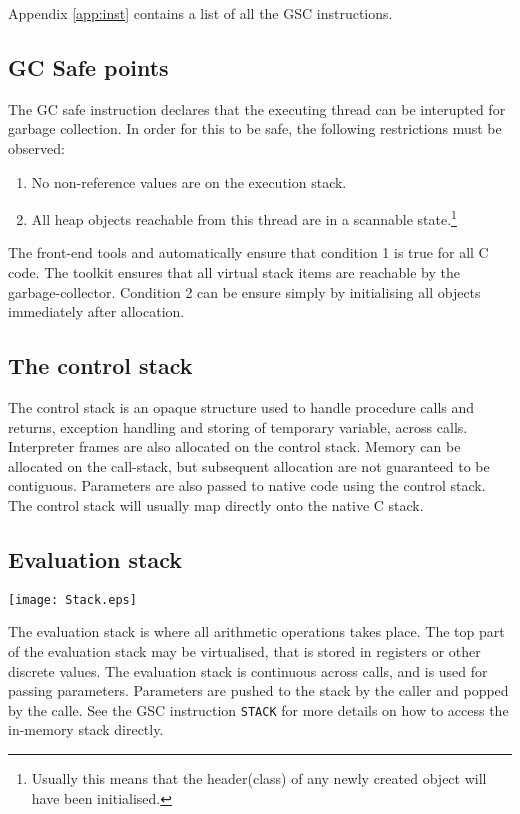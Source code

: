 Appendix \ref{app:inst} contains a list of all the GSC instructions.

\subsection{GC Safe points}
The GC safe instruction declares that the executing thread can be interupted for garbage collection. In order for this to be safe, the following restrictions must be observed:
\begin{enumerate}
\item No non-reference values are on the execution stack.
\item All heap objects reachable from this thread are in a scannable state.\footnote{Usually this means that the header(class) of any newly created object will have been initialised.}
\end{enumerate}
The front-end tools \gvmtc{} and \gvmtic{} automatically ensure that condition 1 is true for all C code.
The toolkit ensures that all virtual stack items are reachable by the garbage-collector.
Condition 2 can be ensure simply by initialising all objects immediately after allocation.

\subsection{The control stack}
The control stack is an opaque structure used to handle procedure calls and returns, exception handling and storing of temporary variable, across calls. Interpreter frames are also allocated on the control stack. Memory can be allocated on the call-stack, but subsequent allocation are not guaranteed to be contiguous. Parameters are also passed to native code using the control stack.
The control stack will usually map directly onto the native C stack.

\subsection{Evaluation stack}

        \begin{center}
        \texttt{[image: Stack.eps]}
        \end{center}


The evaluation stack is where all arithmetic operations takes place. The top part of the evaluation stack may be virtualised, that is stored in registers or other discrete values. The evaluation stack is continuous across calls, and is used for passing parameters. Parameters are pushed to the stack by the caller and popped by the calle. See the GSC instruction \verb|STACK| for more details on how to access the in-memory stack directly.

